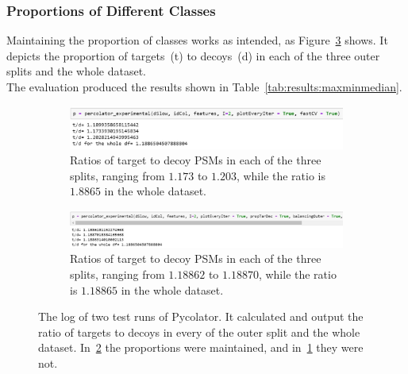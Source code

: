 \subsubsection{Proportions of Different Classes}
\label{lab:results:proportions}
Maintaining the proportion of classes works as intended, as Figure~\ref{fig:results:prop_code} shows. It depicts the proportion of targets~(t) to decoys~(d) in each of the three outer splits and the whole dataset.\\
The evaluation produced the results shown in
Table~\ref{tab:results:maxminmedian}.
\renewcommand{\baselinestretch}{0.9}
\begin{figure}
	\normalsize
	\centering
	\begin{subfigure}{\textwidth}
		\includegraphics[width = \textwidth]{figures/prop_not_kept_code.jpg}
		\caption{Ratios of target to decoy PSMs in each of the three splits, ranging from $1.173$ to $1.203$, while the ratio is $1.8865$ in the whole dataset.}
		\label{fig:results:prop_not_maintained}
	\end{subfigure}
	\begin{subfigure}{\textwidth}
		\includegraphics[width = \textwidth]{figures/prop_kept_code.jpg}
		\caption{Ratios of target to decoy PSMs in each of the three splits, ranging from $1.18862$ to $1.18870$, while the ratio is $1.18865$ in the whole dataset.}
		\label{fig:results:prop_maintained}
	\end{subfigure}
	\caption[Maintaining proportions works as intended]{The log of two test runs of Pycolator. It calculated and output the ratio of targets to decoys in every of the outer split and the whole dataset. In~\ref{fig:results:prop_maintained} the proportions were maintained, and in~\ref{fig:results:prop_not_maintained} they were not.}
	\label{fig:results:prop_code}
\end{figure}
